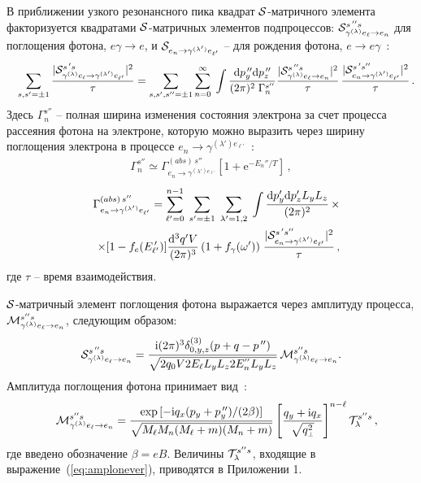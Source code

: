 \documentclass[14pt, russian]{article}
\def\mprp{\mbox{\tiny $\bot$}}
\def\beq{\begin{eqnarray}}
\def\eeq{\end{eqnarray}}
\newcommand{\ii}{\mathrm{i}} %
\newcommand{\dd}{\mathrm{d}} %
\newcommand{\eee}{\mathrm{e}} %
\begin{document}
В приближении узкого резонансного пика квадрат ${\cal S}$-матричного элемента факторизуется квадратами ${\cal S}$-матричных элементов подпроцессов: ${\cal S}^{s^{\,\prime \prime} s}_{\gamma^{(\lambda)} e_\ell \to e_n}$ для поглощения фотона, $e\gamma \to e$, и ${\cal S}_{e_n \to \gamma^{(\lambda')} e_{\ell'}}$ -- для рождения фотона, $e \to e\gamma$~\cite{Rumyantsev:2026}:
%
\beq
\label{eq:S2factor1}
&&\sum\limits_{s, s' = \pm 1} 
\frac{|{\cal S}^{s^{\,\prime} s}_{{\gamma^{(\lambda)} e_\ell \to \gamma^{(\lambda')} e_{\ell'}}}|^2}{\tau} = 
\sum\limits_{s, s', s'' = \pm 1} 
\sum\limits_{n=0}^{\infty} \;  \int \frac{\dd p^{\, \prime \prime}_y 
	\dd p^{\, \prime \prime}_z}{(2 \pi)^2 \; \Gamma_n^{s''}} 
\frac{|{\cal S}^{s^{\,\prime \prime} s}_{\gamma^{(\lambda)} e_\ell \to e_n}|^2}{\tau} \, 
\frac{|{\cal S}^{s^{\,\prime} s''}_{ e_n \to \gamma^{(\lambda')} e_{\ell'}}|^2}{\tau} \, .
\eeq
Здесь $\Gamma_n^{s''}$ -- полная ширина изменения состояния электрона за счет процесса рассеяния фотона на электроне, 
которую можно выразить через ширину поглощения электрона в процессе $e_n \to \gamma^{(\lambda')
	e_{\ell'} }$~\cite{Weldon:1983}:
\begin{eqnarray}
	\label{Gns}
	\Gamma_n^{s''} \simeq 
	\Gamma^{(abs) \, s''}_{e_n  \to \gamma^{(\lambda') e_{\ell'}}} 
	\left [1+ \eee^{-E_n''/T} \right ]\, ,
\end{eqnarray}
%
\beq
\label{eq:e_abs}
&&\Gamma^{(abs) \, s''}_{e_n \to \gamma^{(\lambda')} e_{\ell'}}  = \sum\limits_{\ell' = 
	0}^{n-1} \;  \sum\limits_{s' = \pm 1} \; \sum\limits_{\lambda' = 1, 2} \; 
\int \frac{\dd p'_y \dd p'_z  L_y L_z }{(2\pi)^2} \, \times 
\\
\nonumber
&&\times [1 - f_{e}(E^{\, 
	\prime}_{\ell'})] \frac{\dd^3 q' V}{(2\pi)^3} \, (1 + f_\gamma(\omega')) \;
\frac{|{\cal S}^{s^{\,\prime} s''}_{ e_n \to \gamma^{(\lambda')} 
		e_{\ell'}}|^2}{\tau}\, ,
\eeq 
%
где $\tau$ -- время взаимодействия.

${\cal S}$-матричный элемент поглощения фотона выражается через амплитуду процесса, ${\cal M}^{s'' s}_{\gamma^{(\lambda)} e_\ell \to e_n}$, следующим образом:
\beq
\label{eq:Sjf}                                  
{\cal S}^{s^{\,\prime \prime} s}_{\gamma^{(\lambda)} e_\ell \to e_n} = 
\frac{\ii (2\pi)^3 
	\delta^{(3)}_{0,y,z} (p+q - p^{\, \prime \prime})}
{\sqrt{2q_0 V 2 E_{\ell} L_y L_z 2 E^{''}_{n} L_y L_z}}\, 
{\cal M}^{s'' s}_{\gamma^{(\lambda)} e_\ell \to e_n} .
\eeq
%
\noindent Амплитуда поглощения фотона принимает вид~\cite{Rumyantsev:2017}:
%
\begin{eqnarray}
	\label{eq:amplonever} 
	&&{\cal M}^{s'' s}_{\gamma^{(\lambda)} e_\ell \to e_n} =  \frac{\exp{[-\ii q_x (p_y + p_y^{\,\prime \prime})/(2\beta)]}}{\sqrt{M_{\ell} M_n (M_{\ell} + m) 
			(M_n + m)}} 
	\left [ \frac{q_y+\ii q_x}{\sqrt{q_{\mprp}^2}} \right ]^{n-\ell} {\cal T}^{s'' s}_\lambda \, ,
\end{eqnarray} 
%
где введено обозначение $\beta = eB$. Величины ${\cal T}^{s'' s}_\lambda$, входящие в выражение~(\ref{eq:amplonever}), приводятся в Приложении 1.
\end{document}
